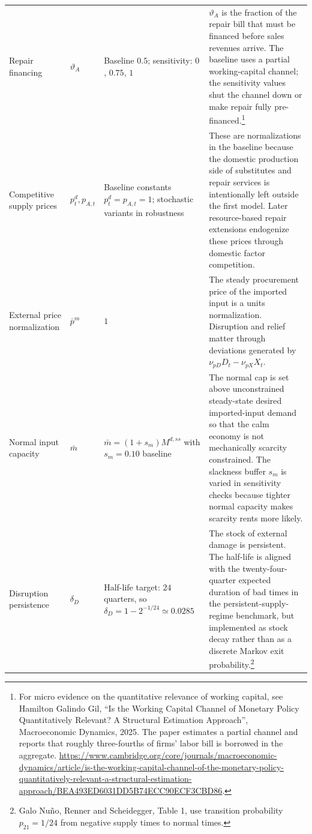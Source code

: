 ﻿\documentclass[12pt]{article}
\theoremstyle{remark}
\begin{document}
\begin{longtable}{
>{\raggedright\arraybackslash}p{}
>{\raggedright\arraybackslash}p{}
>{\raggedright\arraybackslash}p{}
>{\raggedright\arraybackslash}p{}}
Repair financing
&
$\vartheta_A$
&
Baseline $0.5$; sensitivity: $0$, $0.75$, $1$
&
$\vartheta_A$ is the fraction of the repair bill that must be financed before sales revenues arrive.
The baseline uses a partial working-capital channel; the sensitivity values shut the channel down
or make repair fully pre-financed.\footnote{For micro evidence on the quantitative relevance of
working capital, see Hamilton Galindo Gil, ``Is the Working Capital Channel of Monetary Policy
Quantitatively Relevant? A Structural Estimation Approach'', Macroeconomic Dynamics, 2025. The
paper estimates a partial channel and reports that roughly three-fourths of firms' labor bill is
borrowed in the aggregate. \url{https://www.cambridge.org/core/journals/macroeconomic-dynamics/article/is-the-working-capital-channel-of-the-monetary-policy-quantitatively-relevant-a-structural-estimation-approach/BEA493ED6031DD5B74ECC90ECF3CBD86}.}
\\

Competitive supply prices
&
$p_t^d,p_{A,t}$
&
Baseline constants $p_t^d=p_{A,t}=1$; stochastic variants in robustness
&
These are normalizations in the baseline because the domestic production side of substitutes and
repair services is intentionally left outside the first model. Later resource-based repair
extensions endogenize these prices through domestic factor competition.
\\

External price normalization
&
$\bar p^m$
&
$1$
&
The steady procurement price of the imported input is a units normalization. Disruption and relief
matter through deviations generated by $\nu_{pD}D_t-\nu_{pX}X_t$.
\\

Normal input capacity
&
$\bar m$
&
$\bar m=(1+s_m)M^{d,ss}$ with $s_m=0.10$ baseline
&
The normal cap is set above unconstrained steady-state desired imported-input demand so that the
calm economy is not mechanically scarcity constrained. The slackness buffer $s_m$ is varied in
sensitivity checks because tighter normal capacity makes scarcity rents more likely.
\\

Disruption persistence
&
$\delta_D$
&
Half-life target: $24$ quarters, so $\delta_D=1-2^{-1/24}\simeq0.0285$
&
The stock of external damage is persistent. The half-life is aligned with the twenty-four-quarter
expected duration of bad times in the persistent-supply-regime benchmark, but implemented as stock
decay rather than as a discrete Markov exit probability.\footnote{Galo Nu\~no, Renner and
Scheidegger, Table 1, use transition probability $p_{21}=1/24$ from negative supply times to
normal times.}
\\


\end{longtable}
\end{document}
